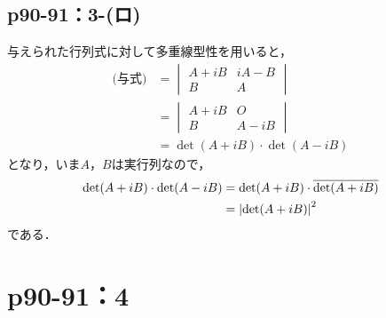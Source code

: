 \documentclass[a4paper,10pt,fleqn]{ltjsarticle}
\begin{document}
\subsection*{p90-91：3-(ロ)}
\begin{tleftbar}
    与えられた行列式に対して多重線型性を用いると，
    \begin{align*}
        \text{(与式)} & =
        \begin{vmatrix}
            A+iB & iA-B \\
            B    & A
        \end{vmatrix}
        \\
                    & = \begin{vmatrix}
                            A+iB & O    \\
                            B    & A-iB
                        \end{vmatrix}
        \\
                    & = \det (A+iB) \cdot \det(A-iB)
    \end{align*}
    となり，いま$A$，$B$は実行列なので，
    \begin{align*}
        \det (A+iB) \cdot \det(A-iB) & = \det (A+iB) \cdot \overline{\det (A+iB)} \\
                                     & = \abs{\det(A+iB)}^2
    \end{align*}
    である．
\end{tleftbar}

\newpage


\section*{p90-91：4}
\end{document}
